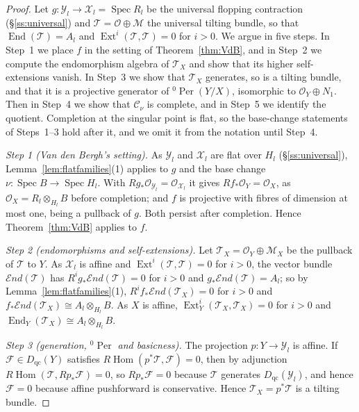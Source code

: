 \documentclass[11pt]{amsart}
\numberwithin{table}{section}
\numberwithin{figure}{section}
\numberwithin{equation}{section}
\theoremstyle{definition}
\theoremstyle{plain}
\newcommand{\cC}{\mathcal{C}}
\newcommand{\cO}{\mathcal{O}}
\newcommand{\cX}{\mathcal{X}}
\newcommand{\cY}{\mathcal{Y}}
\DeclareMathOperator{\Spec}{Spec}
\DeclareMathOperator{\End}{End}
\DeclareMathOperator{\Hom}{Hom}
\DeclareMathOperator{\Ext}{Ext}
\DeclareMathOperator{\Per}{Per}
\newcommand{\sEnd}{\mathscr{E}\!nd}
\begin{document}
\begin{proof}
Let $g\colon \cY_l \to \cX_l = \Spec R_l$ be the universal flopping contraction (\S\ref{ss:universal}) and $\mathcal T = \cO \oplus \mathcal M$ the universal tilting bundle, so that $\End(\mathcal T) = A_l$ and $\Ext^i(\mathcal T, \mathcal T) = 0$ for $i > 0$. We argue in five steps. In Step~1 we place $f$ in the setting of Theorem~\ref{thm:VdB}, and in Step~2 we compute the endomorphism algebra of $\mathcal T_X$ and show that its higher self-extensions vanish. In Step~3 we show that $\mathcal T_X$ generates, so is a tilting bundle, and that it is a projective generator of ${}^0\Per(Y/X)$, isomorphic to $\cO_Y \oplus N_1$. Then in Step~4 we show that $\cC_\nu$ is complete, and in Step~5 we identify the quotient. Completion at the singular point is flat, so the base-change statements of Steps~1--3 hold after it, and we omit it from the notation until Step~4.

\emph{Step 1 (Van den Bergh's setting).} As $\cY_l$ and $\cX_l$ are flat over $H_l$ (\S\ref{ss:universal}), Lemma~\ref{lem:flatfamilies}(1) applies to $g$ and the base change $\nu\colon \Spec B \to \Spec H_l$. With $Rg_*\cO_{\cY_l} = \cO_{\cX_l}$ it gives $Rf_*\cO_Y = \cO_X$, as $\cO_X = R_l \otimes_{H_l} B$ before completion; and $f$ is projective with fibres of dimension at most one, being a pullback of $g$. Both persist after completion. Hence Theorem~\ref{thm:VdB} applies to $f$.

\emph{Step 2 (endomorphisms and self-extensions).} Let $\mathcal T_X = \cO_Y \oplus \mathcal M_X$ be the pullback of $\mathcal T$ to $Y$. As $\cX_l$ is affine and $\Ext^i(\mathcal T, \mathcal T) = 0$ for $i > 0$, the vector bundle $\sEnd(\mathcal T)$ has $R^ig_*\sEnd(\mathcal T) = 0$ for $i > 0$ and $g_*\sEnd(\mathcal T) = A_l$; so by Lemma~\ref{lem:flatfamilies}(1), $R^if_*\sEnd(\mathcal T_X) = 0$ for $i > 0$ and $f_*\sEnd(\mathcal T_X) \cong A_l \otimes_{H_l} B$. As $X$ is affine, $\Ext^i_Y(\mathcal T_X, \mathcal T_X) = 0$ for $i > 0$ and $\End_Y(\mathcal T_X) \cong A_l \otimes_{H_l} B$.

\emph{Step 3 (generation, ${}^0\Per$ and basicness).} The projection $p\colon Y \to \cY_l$ is affine. If $\mathcal F \in D_{\mathrm{qc}}(Y)$ satisfies $R\Hom(p^*\mathcal T, \mathcal F) = 0$, then by adjunction $R\Hom(\mathcal T, Rp_*\mathcal F) = 0$, so $Rp_*\mathcal F = 0$ because $\mathcal T$ generates $D_{\mathrm{qc}}(\cY_l)$, and hence $\mathcal F = 0$ because affine pushforward is conservative. Hence $\mathcal T_X = p^*\mathcal T$ is a tilting bundle.


\end{proof}
\end{document}
